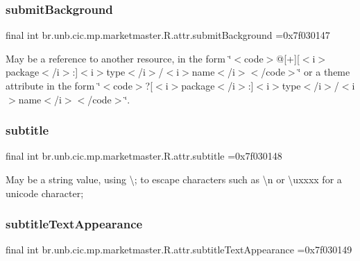 \subsubsection{\texorpdfstring{submit\+Background}{submitBackground}}
{\footnotesize\ttfamily final int br.\+unb.\+cic.\+mp.\+marketmaster.\+R.\+attr.\+submit\+Background =0x7f030147\hspace{0.3cm}{\ttfamily [static]}}

May be a reference to another resource, in the form \char`\"{}$<$code$>$@\mbox{[}+\mbox{]}\mbox{[}$<$i$>$package$<$/i$>$\+:\mbox{]}$<$i$>$type$<$/i$>$/$<$i$>$name$<$/i$>$$<$/code$>$\char`\"{} or a theme attribute in the form \char`\"{}$<$code$>$?\mbox{[}$<$i$>$package$<$/i$>$\+:\mbox{]}$<$i$>$type$<$/i$>$/$<$i$>$name$<$/i$>$$<$/code$>$\char`\"{}. \mbox{\label{classbr_1_1unb_1_1cic_1_1mp_1_1marketmaster_1_1R_1_1attr_adae38c5461ad50c4619e4a5831242ff7}} 
\subsubsection{\texorpdfstring{subtitle}{subtitle}}
{\footnotesize\ttfamily final int br.\+unb.\+cic.\+mp.\+marketmaster.\+R.\+attr.\+subtitle =0x7f030148\hspace{0.3cm}{\ttfamily [static]}}

May be a string value, using \textquotesingle{}\textbackslash{};\textquotesingle{} to escape characters such as \textquotesingle{}\textbackslash{}n\textquotesingle{} or \textquotesingle{}\textbackslash{}uxxxx\textquotesingle{} for a unicode character; \mbox{\label{classbr_1_1unb_1_1cic_1_1mp_1_1marketmaster_1_1R_1_1attr_a738987660ce1c614b0959cc0f2c11579}} 
\subsubsection{\texorpdfstring{subtitle\+Text\+Appearance}{subtitleTextAppearance}}
{\footnotesize\ttfamily final int br.\+unb.\+cic.\+mp.\+marketmaster.\+R.\+attr.\+subtitle\+Text\+Appearance =0x7f030149\hspace{0.3cm}{\ttfamily [static]}}

